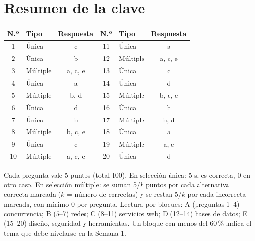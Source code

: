 \documentclass[11pt,a4paper]{article}
\newcounter{preg}
\begin{document}
	\section*{\color{uteqBlue}\large Resumen de la clave}
	\begin{center}
		\small
		\begin{tabular}{@{}clc|clc@{}}
			\toprule
			\textbf{N.º} & \textbf{Tipo} & \textbf{Respuesta} & \textbf{N.º} & \textbf{Tipo} & \textbf{Respuesta} \\
			\midrule
			1 & Única & c & 11 & Única & a \\
			2 & Única & b & 12 & Múltiple & a, c, e \\
			3 & Múltiple & a, c, e & 13 & Única & c \\
			4 & Única & a & 14 & Única & d \\
			5 & Múltiple & b, d & 15 & Múltiple & b, c, e \\
			6 & Única & d & 16 & Única & b \\
			7 & Única & b & 17 & Múltiple & b, d \\
			8 & Múltiple & b, c, e & 18 & Única & a \\
			9 & Única & c & 19 & Múltiple & a, c \\
			10 & Múltiple & a, c, e & 20 & Única & d \\
			\bottomrule
		\end{tabular}
	\end{center}
	\begin{tcolorbox}[colback=uteqAmber!8,colframe=uteqAmber!80!black,boxrule=0.5pt,arc=1mm,title=Criterio sugerido de puntuación diagnóstica,fonttitle=\bfseries\small,fontupper=\small]
		Cada pregunta vale 5 puntos (total 100). En selección única: 5 si es correcta, 0 en otro caso. En selección múltiple: se suman 5/$k$ puntos por cada alternativa correcta marcada ($k$ = número de correctas) y se restan 5/$k$ por cada incorrecta marcada, con mínimo 0 por pregunta. Lectura por bloques: A (preguntas 1--4) concurrencia; B (5--7) redes; C (8--11) servicios web; D (12--14) bases de datos; E (15--20) diseño, seguridad y herramientas. Un bloque con menos del 60\,\% indica el tema que debe nivelarse en la Semana 1.
	\end{tcolorbox}
	\printbibliography[title={Referencias}]
\fi
\end{document}
